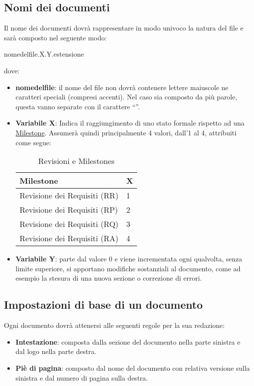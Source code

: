 \subsection{Nomi dei documenti}
\label{sec:nomi_documenti}
Il nome dei documenti dovrà rappresentare in modo univoco la natura del file e sarà composto nel seguente modo:
\begin{center}
nome\textunderscore del\textunderscore file.X.Y.estensione
\end{center}
dove:
\begin{itemize}
\item \textbf{nome\textunderscore del\textunderscore file}: il nome del file non dovrà contenere lettere maiuscole ne caratteri speciali (compresi accenti). Nel caso sia composto da più parole, questa vanno separate con il carattere ``''.
\item \textbf{Variabile X}: Indica il raggiungimento di uno stato formale rispetto ad una \underline{Milestone}. Assumerà quindi principalmente 4 valori, dall'1 al 4, attribuiti come segue:
\begin{table}[h]
\centering
{}
\begin{tabular}{ll}
\toprule
Milestone & X\\
\midrule
Revisione dei Requisiti (RR) & 1\\
Revisione dei Requisiti (RP) & 2\\
Revisione dei Requisiti (RQ) & 3\\
Revisione dei Requisiti (RA) & 4\\
\bottomrule
\end{tabular}
\caption{Revisioni e Milestones}
\end{table}
\item \textbf{Variabile Y}: parte dal valore 0 e viene incrementata ogni qualvolta, senza limite superiore, si apportano modifiche sostanziali al documento, come ad esempio la stesura di una nuova sezione o correzione di errori.
\end{itemize}

\subsection{Impostazioni di base di un documento}
Ogni documento dovrà attenersi alle seguenti regole per la sua redazione:
\begin{itemize}
\item \textbf{Intestazione}: composta dalla sezione del documento nella parte sinistra e dal logo nella parte destra.
\item \textbf{Piè di pagina}: composto dal nome del documento con relativa versione sulla sinistra  e dal numero di pagina sulla destra.
\end{itemize}

